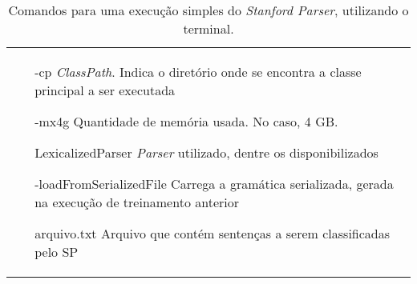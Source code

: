 \begin{table}[h!]
    \centering
    \begin{tabular}{p{}}
        \begin{itemize}
            \item [-cp] \textit{ClassPath}. Indica o diretório onde se encontra a classe principal a ser executada
            \item [-mx4g] Quantidade de memória usada. No caso, 4 GB.
            \item [LexicalizedParser] \textit{Parser} utilizado, dentre os disponibilizados
            \item [-loadFromSerializedFile] Carrega a gramática serializada, gerada na execução de treinamento anterior
            \item [arquivo.txt] Arquivo que contém sentenças a serem classificadas pelo SP
        \end{itemize}
    \end{tabular}
    \caption[Comandos para uma execução simples do \textit{Stanford Parser}]{Comandos para uma execução simples do \textit{Stanford Parser}, utilizando o terminal.}
    \label{tab:tab_exec_basico_cintil}
\end{table}